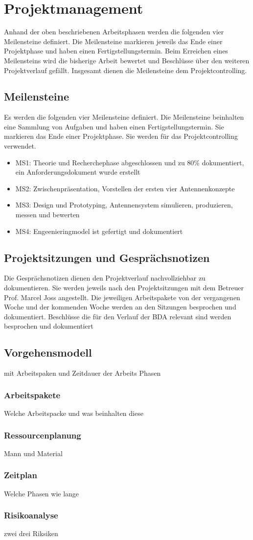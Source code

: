 \newpage
\chapter{Projektmanagement}
Anhand der oben beschriebenen Arbeitsphasen werden die folgenden vier Meilensteine definiert. Die Meilensteine markieren jeweils das Ende einer Projektphase und haben einen Fertigstellungstermin. Beim Erreichen eines Meilensteins wird die bisherige Arbeit bewertet und Beschlüsse über den weiteren Projektverlauf gefällt. Insgesamt dienen die Meilensteine dem Projektcontrolling.
\section{Meilensteine}
Es werden die folgenden vier Meilensteine definiert. Die Meilensteine
beinhalten   eine Sammlung von Aufgaben und haben einen
Fertigstellungstermin. Sie markieren das Ende einer Projektphase. Sie
werden für das Projektcontrolling verwendet. 
	\begin{itemize}
		\item MS1: Theorie und Recherchephase abgeschlossen und zu 80\% dokumentiert, ein Anforderungsdokument wurde erstellt
		\item MS2: Zwischenpräsentation, Vorstellen der ersten vier Antennenkonzepte
		\item MS3: Design und Prototyping, Antennensystem simulieren, produzieren, messen und bewerten
		\item MS4: Engeenieringmodel ist gefertigt und dokumentiert
	\end{itemize}

\section{Projektsitzungen und Gesprächsnotizen}
Die Gesprächsnotizen dienen den Projektverlauf nachvollziehbar zu dokumentieren. Sie werden jeweils nach den Projektsitzungen mit dem Betreuer Prof. Marcel Joss angestellt. Die jeweiligen Arbeitspakete von der vergangenen Woche und der kommenden Woche werden an den Sitzungen besprochen und dokumentiert. Beschlüsse die für den Verlauf der BDA relevant sind werden besprochen und dokumentiert
\section{Vorgehensmodell}
mit Arbeitspaken und Zeitdauer der Arbeits Phasen
\subsection{Arbeitspakete}
Welche Arbeitspacke und was beinhalten diese
\subsection{Ressourcenplanung}
Mann und Material 
\subsection{Zeitplan}
Welche Phasen wie lange
\subsection{Risikoanalyse}
zwei drei Riksiken
